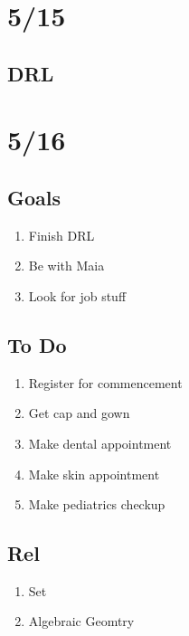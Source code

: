 \documentclass[11pt]{article}
\theoremstyle{remark}
\begin{document}
\section{5/15}

\subsection{DRL}

\section{5/16}

\subsection{Goals}

\begin{enumerate}
	\item Finish DRL
	\item Be with Maia
	\item Look for job stuff
\end{enumerate}

\subsection{To Do}

\begin{enumerate}
	\item Register for commencement
	\item Get cap and gown
	\item Make dental appointment
	\item Make skin appointment
	\item Make pediatrics checkup
\end{enumerate}

\subsection{Rel}

\begin{enumerate}
	\item Set
	\item Algebraic Geomtry
\end{enumerate}
\end{document}

